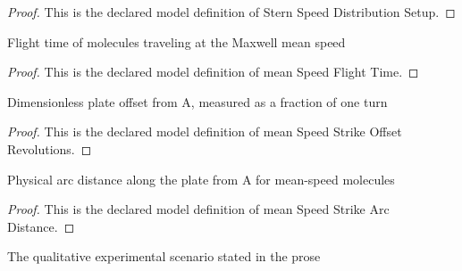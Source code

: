 \begin{proof}
  This is the declared model definition of Stern Speed Distribution Setup.
\end{proof}
\begin{definition}
  \label{def:physics:phyx-mini-0564:phyxminiproblems-problemphyxmini0564-meanspeedflighttime}
  Flight time of molecules traveling at the Maxwell mean speed
\end{definition}
\begin{proof}
  This is the declared model definition of mean Speed Flight Time.
\end{proof}
\begin{definition}
  \label{def:physics:phyx-mini-0564:phyxminiproblems-problemphyxmini0564-meanspeedstrikeoffsetrevolutions}
  Dimensionless plate offset from A, measured as a fraction of one turn
\end{definition}
\begin{proof}
  This is the declared model definition of mean Speed Strike Offset Revolutions.
\end{proof}
\begin{definition}
  \label{def:physics:phyx-mini-0564:phyxminiproblems-problemphyxmini0564-meanspeedstrikearcdistance}
  Physical arc distance along the plate from A for mean-speed molecules
\end{definition}
\begin{proof}
  This is the declared model definition of mean Speed Strike Arc Distance.
\end{proof}
\begin{definition}
  \label{def:physics:phyx-mini-0564:phyxminiproblems-problemphyxmini0564-matchessternexperimentscenario}
  The qualitative experimental scenario stated in the prose
\end{definition}
